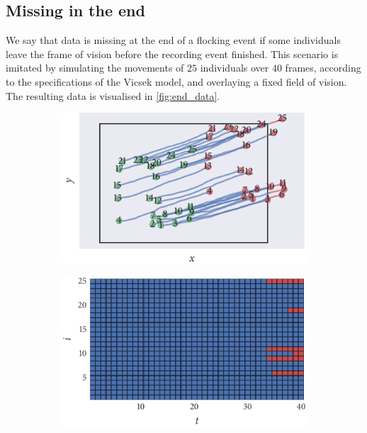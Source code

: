 \subsection{Missing in the end}

We say that data is missing at the end of a flocking event if some individuals
leave the frame of vision before the recording event finished. This scenario is
imitated by simulating the movements of $25$ individuals over $40$ frames,
according to the specifications of the Vicsek model, and overlaying a fixed
field of vision. The resulting data is visualised in \cref{fig:end_data}.

\begin{figure}[tbp]
  \begin{subfigure}[b]{0.5\textwidth}
    \includegraphics{end/data.pdf}
    \caption{}
    \label{subfig:end_data}
  \end{subfigure}%
  \begin{subfigure}[b]{0.5\textwidth}
    \includegraphics{end/missing_array.pdf}
    \caption{}
    \label{subfig:end_missing}
  \end{subfigure}

\end{figure}
